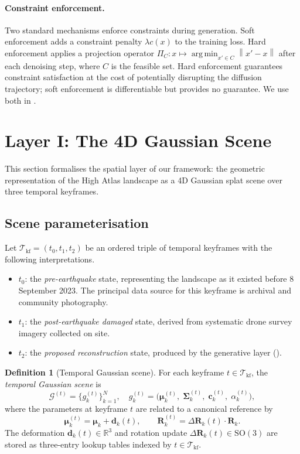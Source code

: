 \documentclass[11pt,a4paper]{article}
\theoremstyle{plain}
\theoremstyle{definition}
\newtheorem{definition}[theorem]{Definition}
\theoremstyle{remark}
\newcommand{\norm}[1]{\left\lVert #1 \right\rVert}
\DeclareMathOperator*{\argmin}{arg\,min}
\newcommand{\SO}{\mathrm{SO}}
\newcommand{\GS}{\mathcal{G}}
\newcommand{\kf}{\mathcal{T}_{\mathrm{kf}}}
\begin{document}
\paragraph{Constraint enforcement.}
Two standard mechanisms enforce constraints during generation. Soft
enforcement adds a constraint penalty $\lambda c(x)$ to the training
loss. Hard enforcement applies a projection operator $\Pi_C : x \mapsto
\argmin_{x' \in C} \norm{x' - x}$ after each denoising step, where $C$
is the feasible set. Hard enforcement guarantees constraint satisfaction
at the cost of potentially disrupting the diffusion trajectory; soft
enforcement is differentiable but provides no guarantee. We use both
in .

\section{Layer I: The 4D Gaussian Scene}
\label{sec:layer1}

This section formalises the spatial layer of our framework: the geometric
representation of the High Atlas landscape as a 4D Gaussian splat scene
over three temporal keyframes.

\subsection{Scene parameterisation}
\label{sec:layer1_scene}

Let $\kf = (t_0, t_1, t_2)$ be an ordered triple of temporal keyframes
with the following interpretations.
\begin{itemize}[leftmargin=2em]
  \item $t_0$: the \emph{pre-earthquake} state, representing the landscape
    as it existed before 8 September 2023. The principal data source for
    this keyframe is archival and community photography.
  \item $t_1$: the \emph{post-earthquake damaged} state, derived from
    systematic drone survey imagery collected on site.
  \item $t_2$: the \emph{proposed reconstruction} state, produced by
    the generative layer ().
\end{itemize}

\begin{definition}[Temporal Gaussian scene]
\label{def:temporal_scene}
For each keyframe $t \in \kf$, the \emph{temporal Gaussian scene}
is
\[
  \GS^{(t)} = \bigl\{g_k^{(t)}\bigr\}_{k=1}^N,
  \quad
  g_k^{(t)} =
  \bigl({\boldsymbol\mu}_k^{(t)},\;
        {\boldsymbol\Sigma}_k^{(t)},\;
        \mathbf{c}_k^{(t)},\;
        \alpha_k^{(t)}\bigr),
\]
where the parameters at keyframe $t$ are related to a canonical
reference by
\[
  {\boldsymbol\mu}_k^{(t)}
  = {\boldsymbol\mu}_k + \mathbf{d}_k(t),
  \qquad
  \mathbf{R}_k^{(t)} = \Delta\mathbf{R}_k(t) \cdot \mathbf{R}_k.
\]
The deformation $\mathbf{d}_k(t) \in \mathbb{R}^3$ and rotation update
$\Delta\mathbf{R}_k(t) \in \SO(3)$ are stored as three-entry lookup
tables indexed by $t \in \kf$.
\end{definition}
\end{document}
